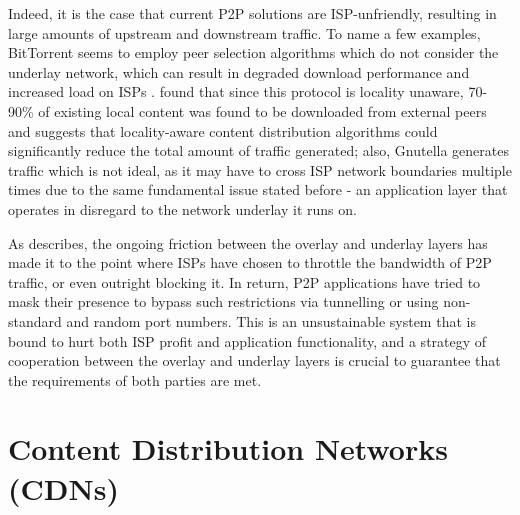 \documentclass[
  oneside,
  11pt, a4paper,
  footinclude=true,
  headinclude=true,
  cleardoublepage=empty
]{scrbook}
\begin{document}
	Indeed, it is the case that current P2P solutions are ISP-unfriendly, resulting in large amounts of upstream and downstream traffic. To name a few examples, BitTorrent seems to employ peer selection algorithms which do not consider the underlay network, which can result in degraded download performance and increased load on ISPs \cite{qin2009}. \cite{karagiannis} found that since this protocol is locality unaware, 70-90\% of existing local content was found to be downloaded from external peers and suggests that locality-aware content distribution algorithms could significantly reduce the total amount of traffic generated; also, Gnutella generates traffic which is not ideal, as it may have to cross ISP network boundaries multiple times \cite{estimating-gnutella} due to the same fundamental issue stated before - an application layer that operates in disregard to the network underlay it runs on.
	
	As \cite{dan-Commag10} describes, the ongoing friction between the overlay and underlay layers has made it to the point where ISPs have chosen to throttle the bandwidth of P2P traffic, or even outright blocking it. In return, P2P applications have tried to mask their presence to bypass such restrictions via tunnelling or using non-standard and random port numbers. This is an unsustainable system that is bound to hurt both ISP profit and application functionality, and a strategy of cooperation between the overlay and underlay layers is crucial to guarantee that the requirements of both parties are met.
	
	
	\section{Content Distribution Networks (CDNs)}
\end{document}
